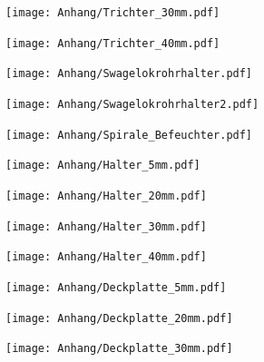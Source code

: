 \begin{figure}
	\texttt{[image: Anhang/Trichter\_30mm.pdf]}
\end{figure}

\begin{figure}  
	\texttt{[image: Anhang/Trichter\_40mm.pdf]}
\end{figure}

\begin{figure}  
	\texttt{[image: Anhang/Swagelokrohrhalter.pdf]}
\end{figure}

\begin{figure}  
	\texttt{[image: Anhang/Swagelokrohrhalter2.pdf]}
\end{figure}

\begin{figure}  
	\texttt{[image: Anhang/Spirale\_Befeuchter.pdf]}
\end{figure}

\begin{figure}  
	\texttt{[image: Anhang/Halter\_5mm.pdf]}
\end{figure}

\begin{figure}  
	\texttt{[image: Anhang/Halter\_20mm.pdf]}
\end{figure}

\begin{figure}  
	\texttt{[image: Anhang/Halter\_30mm.pdf]}
\end{figure}

\begin{figure}  
	\texttt{[image: Anhang/Halter\_40mm.pdf]}
\end{figure}

\begin{figure}  
	\texttt{[image: Anhang/Deckplatte\_5mm.pdf]}
\end{figure}

\begin{figure}  
	\texttt{[image: Anhang/Deckplatte\_20mm.pdf]}
\end{figure}

\begin{figure}  
	\texttt{[image: Anhang/Deckplatte\_30mm.pdf]}
\end{figure}

